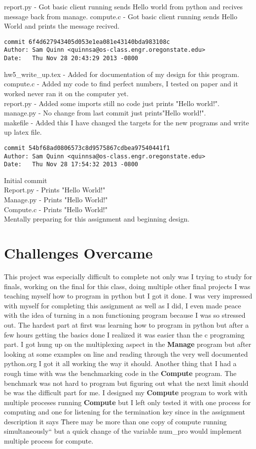 \documentclass[letterpaper,10pt,notitlepage,fleqn]{article}
\begin{document}
    report.py - Got basic client running sends Hello world from python and recives\\ message back from manage.
    compute.c - Got basic client running sends Hello World and prints the message recived.
\begin{verbatim}
commit 6f4d627943405d053e1ea081e43140bda983108c
Author: Sam Quinn <quinnsa@os-class.engr.oregonstate.edu>
Date:   Thu Nov 28 20:43:29 2013 -0800
\end{verbatim}
    hw5\_write\_up.tex - Added for documentation of my design for this program.\\
    compute.c - Added my code to find perfect numbers, I tested on paper and it worked never ran it on the computer yet.\\
    report.py - Added some imports still no code just prints "Hello world!".\\
    manage.py - No change from last commit just prints"Hello world!".\\
    makefile - Added this I have changed the targets for the new programs and write up latex file.
\begin{verbatim}
commit 54bf68ad0806573c8d9575867cdbea97540441f1
Author: Sam Quinn <quinnsa@os-class.engr.oregonstate.edu>
Date:   Thu Nov 28 17:54:32 2013 -0800
\end{verbatim}
    Initial commit\\
    Report.py - Prints "Hello World!"\\
    Manage.py - Prints "Hello World!"\\
    Compute.c - Prints "Hello World!"\\
    Mentally preparing for this assignment and beginning design.
\section*{Challenges Overcame}
This project was especially difficult to complete not only was I trying to study for finals, working on the final for this class, doing multiple other final projects I was teaching myself how to program in python but I got it done. I was very impressed with myself for completing this assignment as well as I did, I even made peace with the idea of turning in a non functioning program because I was so stressed out. The hardest part at first was learning how to program in python but after a few hours getting the basics done I realized it was easier than the c programing part. I got hung up on the multiplexing aspect in the \textbf{Manage} program but after looking at some examples on line and reading through the very well documented python.org I got it all working the way it should. Another thing that I had a rough time with was the benchmarking code in the \textbf{Compute} program. The benchmark was not hard to program but figuring out what the next limit should be was the difficult part for me. I designed my \textbf{Compute} program to work with multiple proceses running \textbf{Compute} but I left only tested it with one process for computing and one for listening for the termination key since in the assignment description it says \"There may be more than one copy of compute running simultaneously`` but a quick change of the variable num\_pro would implement multiple process for compute.
    
\end{document}
